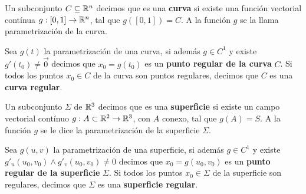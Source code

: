 \begin{definition}
Un subconjunto $C \subseteq \mathbb{R}^n$ decimos que es una \textbf{curva}  si existe una función vectorial contínua $g: [0,1] \to \mathbb{R}^n$, tal que $ g([0,1]) = C$.  A la función $ g$ se la llama parametrización de la curva.

Sea $ g(t)$ la parametrización de una curva, si además $ g \in C^1$ y existe $ g'(t_0) \neq \vec{0}$ decimos que $x_0 = g(t_0)$ es un \textbf{punto regular de la curva}  $C$.  Si todos los puntos $x_0 \in C$ de la curva son puntos regulares, decimos que $C$ es una \textbf{curva regular}.

Un subconjunto $ \Sigma$ de $ \mathbb{R}^3$ decimos que es una \textbf{superficie}  si existe un campo vectorial contínuo $ g: A \subset \mathbb{R}^2 \to \mathbb{R}^3$, con $A$ conexo, tal que $ g(A) = S$.  A la función $g$ se le dice la parametrización de la superficie $\Sigma$.

Sea $ g(u,v)$ la parametrización de una superficie, si además $ g \in C^1$ y existe $ g'_u(u_0, v_0) \wedge g'_v(u_0,v_0) \neq 0$ decimos que $x_0 = g(u_0, v_0)$ es un \textbf{punto regular de la superficie}  $\Sigma$.  Si todos los puntos $x_0 \in \Sigma$ de la superficie son regulares, decimos que $\Sigma$ es una \textbf{superficie regular}.
\end{definition}

